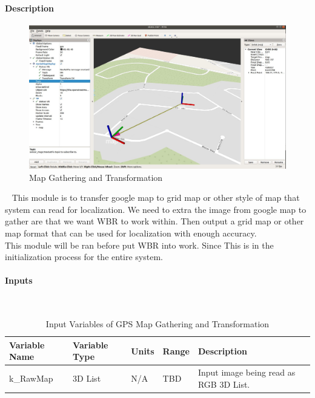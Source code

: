 \documentclass[12pt]{article}
\begin{document}
            \paragraph{Description}
                \begin{figure}[H]
                    \centering
                    \includegraphics[width=\textwidth,height=\textheight,keepaspectratio]{../localization.png}
                    \caption{Map Gathering and Transformation}
                \end{figure}
                ~\newline
                This module is to transfer google map to grid map or other style of map that system can read for localization. We need to extra the image from google map to gather are that we want WBR to work within. Then output a grid map or other map format that can be used for localization with enough accuracy.  \\
                This module will be ran before put WBR into work. Since This is in the initialization process for the entire system. 
            \paragraph{Inputs}
                ~\newline
                \begin{table}[H]
                  \centering
                    \caption{Input Variables of GPS Map Gathering and Transformation} \label{tbl:Input Variables of GPS Map Gathering and Transformation}
                  \begin{tabularx}{\textwidth}{|p{5cm}|p{2cm}|p{1.2cm}|p{1cm}|X|}
                    \hline Variable Name & Variable Type & Units & Range & Description \\
                    \hline k\_RawMap & 3D List &  N/A & TBD & Input image being read as RGB 3D List.\\
                    \hline
                  \end{tabularx}
                \end{table}            
                
\end{document}
